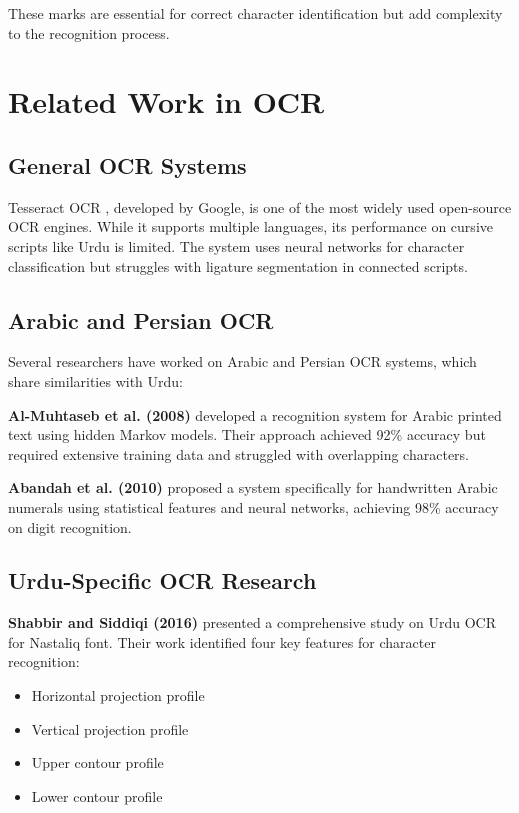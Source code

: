 \documentclass[12pt,a4paper,oneside]{report}
\begin{document}
These marks are essential for correct character identification but add complexity to the recognition process.

\section{Related Work in OCR}

\subsection{General OCR Systems}

Tesseract OCR \cite{smith2007overview}, developed by Google, is one of the most widely used open-source OCR engines. While it supports multiple languages, its performance on cursive scripts like Urdu is limited. The system uses neural networks for character classification but struggles with ligature segmentation in connected scripts.

\subsection{Arabic and Persian OCR}

Several researchers have worked on Arabic and Persian OCR systems, which share similarities with Urdu:

\textbf{Al-Muhtaseb et al. (2008)} \cite{almuhtaseb2008recognition} developed a recognition system for Arabic printed text using hidden Markov models. Their approach achieved 92\% accuracy but required extensive training data and struggled with overlapping characters.

\textbf{Abandah et al. (2010)} \cite{abandah2010recognizing} proposed a system specifically for handwritten Arabic numerals using statistical features and neural networks, achieving 98\% accuracy on digit recognition.

\subsection{Urdu-Specific OCR Research}

\textbf{Shabbir and Siddiqi (2016)} \cite{shabbir2016optical} presented a comprehensive study on Urdu OCR for Nastaliq font. Their work identified four key features for character recognition:
\begin{itemize}
    \item Horizontal projection profile
    \item Vertical projection profile
    \item Upper contour profile
    \item Lower contour profile
\end{itemize}
\end{document}
